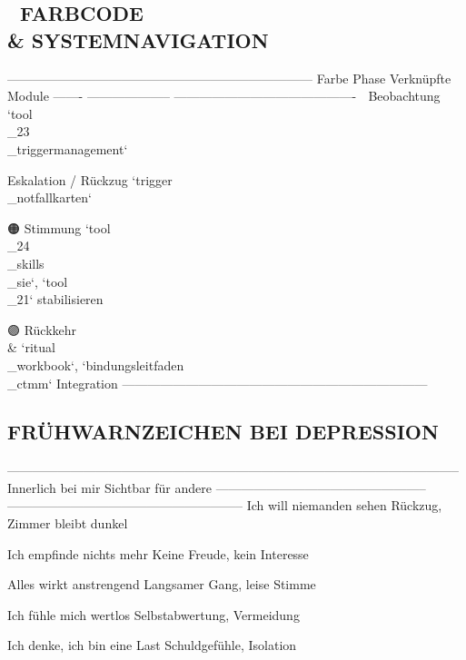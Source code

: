 \subsection{🎨 FARBCODE \\& SYSTEMNAVIGATION}

------------------------------------------------------------------------
Farbe   Phase                Verknüpfte Module
------- -------------------- -------------------------------------------
🔵      Beobachtung          `tool\\_23\\_triggermanagement`

\textcolor{ctmmRed}{}      Eskalation / Rückzug `trigger\\_notfallkarten`

🟠      Stimmung             `tool\\_24\\_skills\\_sie`, `tool\\_21`
stabilisieren

🟣      Rückkehr \\&           `ritual\\_workbook`, `bindungsleitfaden\\_ctmm`
Integration
------------------------------------------------------------------------

\subsection{\textcolor{ctmmBlue}{} FRÜHWARNZEICHEN BEI DEPRESSION}

-----------------------------------------------------------------------------------------------------------
Innerlich bei mir                                  Sichtbar für andere
-------------------------------------------------- --------------------------------------------------------
Ich will niemanden sehen                           Rückzug, Zimmer bleibt dunkel

Ich empfinde nichts mehr                           Keine Freude, kein Interesse

Alles wirkt anstrengend                            Langsamer Gang, leise Stimme

Ich fühle mich wertlos                             Selbstabwertung, Vermeidung

Ich denke, ich bin eine Last                       Schuldgefühle, Isolation

